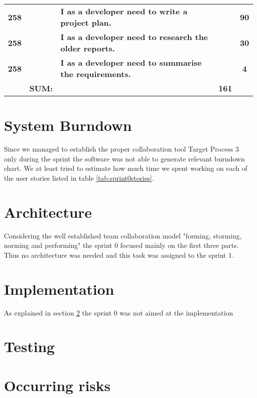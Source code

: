 \begin{table*}[!h]
\begin{tabularx}{\textwidth}{ccXcc}
\textbf{258} 	&
	& \textbf{I as a developer need to write a project plan.} 						&  			& \textbf{90} \\

\textbf{258} 	&
	& \textbf{I as a developer need to research the older reports.} 						&  			& \textbf{30} \\

\textbf{258} 	&
	& \textbf{I as a developer need to summarise the requirements.} 						&  			& \textbf{4} \\
\midrule
				& \textbf{SUM:}		&			& \textbf{161}
 \\																			
\bottomrule[1mm]

\end{tabularx}
\end{table*}

\section{System Burndown}
Since we managed to establish the proper collaboration tool Target Process 3 only during the sprint the software was not able to generate relevant burndown chart.
We at least tried to estimate how much time we spent working on each of the user stories listed in table \ref{tab:sprint0stories}.

\section{Architecture} \label{txt:sprint0architecture}

Considering the well established team collaboration model "forming, storming, norming and performing" the sprint 0 focused mainly on the first three parts.
Thus no architecture was needed and this task was assigned to the sprint 1.

\section{Implementation}

As explained in section \ref{txt:sprint0architecture} the sprint 0 was not aimed at the implementation

\section{Testing}
\section{Occurring risks}
